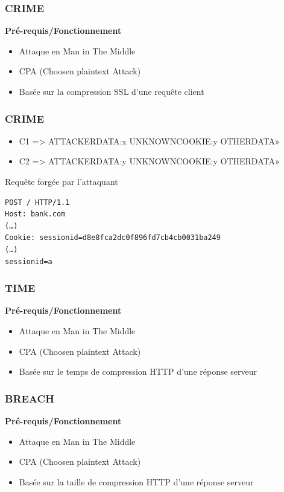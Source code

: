 \begin{frame}
  \frametitle{CRIME}
  \textbf{Pré-requis/Fonctionnement}
  \begin{itemize}
  \item Attaque en Man in The Middle
  \item CPA (Choosen plaintext Attack)
  \item Basée sur la compression SSL d'une requête client
  \end{itemize}
\end{frame}

\begin{frame}[fragile]
  \frametitle{CRIME}
  \begin{itemize}
  \item C1 => ATTACKERDATA:x UNKNOWNCOOKIE:y OTHERDATA»
  \item C2 => ATTACKERDATA:y UNKNOWNCOOKIE:y OTHERDATA»
  \end{itemize}
\pause

\begin{block}{Requête forgée par l'attaquant}
\begin{verbatim}
POST / HTTP/1.1
Host: bank.com
(…)
Cookie: sessionid=d8e8fca2dc0f896fd7cb4cb0031ba249
(…)
sessionid=a
\end{verbatim}
\end{block}
\end{frame}

\begin{frame}
  \frametitle{TIME}
  \textbf{Pré-requis/Fonctionnement}
  \begin{itemize}
  \item Attaque en Man in The Middle
  \item CPA (Choosen plaintext Attack)
  \item Basée sur le temps  de compression HTTP d'une réponse serveur
  \end{itemize}
\end{frame}

\begin{frame}
  \frametitle{BREACH}
  \textbf{Pré-requis/Fonctionnement}
  \begin{itemize}
  \item Attaque en Man in The Middle
  \item CPA (Choosen plaintext Attack)
  \item Basée sur la taille de compression HTTP d'une réponse serveur
  \end{itemize}
\end{frame}

